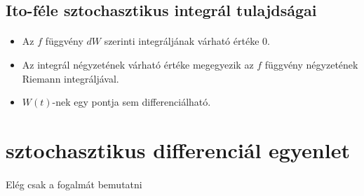 \documentclass[11pt,a4pape,draftr]{article}
\begin{document}
				\subsection{Ito-féle sztochasztikus integrál tulajdságai}
					\paragraph{}
						\begin{itemize}
							  \item Az $f$ függvény $dW$ szerinti integráljának várható értéke $0$.
							  \item Az integrál négyzetének várható értéke megegyezik az $f$ függvény négyzetének Riemann integráljával.
							  \item $W(t)$-nek egy pontja sem differenciálható.
						\end{itemize}

			\section{sztochasztikus differenciál egyenlet}
				\paragraph{}
					Elég csak a fogalmát bemutatni
\end{document}

